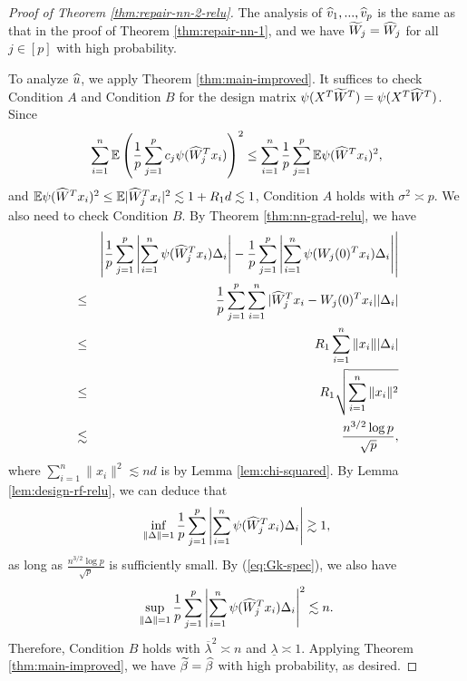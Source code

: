 \begin{proof}[Proof of Theorem \ref{thm:repair-nn-2-relu}]
The analysis of $\widehat{v}_1,...,\widehat{v}_p$ is the same as that in the proof of Theorem \ref{thm:repair-nn-1}, and we have $\widetilde{W}_j=\widehat{W}_j$ for all $j\in[p]$ with high probability.

To analyze $\widehat{u}$, we apply Theorem \ref{thm:main-improved}. It suffices to check Condition $A$ and Condition $B$ for the design matrix $\psi(X^T\widetilde{W}^T)=\psi(X^T\widehat{W}^T)$. Since
$$\sum_{i=1}^n\mathbb{E}\left(\frac{1}{p}\sum_{j=1}^pc_j\psi(\widehat{W}_j^Tx_i)\right)^2\leq \sum_{i=1}^n\frac{1}{p}\sum_{j=1}^p\mathbb{E}\psi(\widehat{W}^Tx_i)^2,$$
and $\mathbb{E}\psi(\widehat{W}^Tx_i)^2\leq \mathbb{E}|\widehat{W}_j^Tx_i|^2\lesssim 1 + R_1d\lesssim 1$, Condition $A$ holds with $\sigma^2\asymp p$.
We also need to check Condition $B$. By Theorem \ref{thm:nn-grad-relu}, we have
\begin{eqnarray*}
&& \left|\frac{1}{p}\sum_{j=1}^p\left|\sum_{i=1}^n\psi(\wh{W}_j^Tx_i)\Delta_i\right| - \frac{1}{p}\sum_{j=1}^p\left|\sum_{i=1}^n\psi(W_j(0)^Tx_i)\Delta_i\right|\right| \\
&\leq& \frac{1}{p}\sum_{j=1}^p\sum_{i=1}^n|\wh{W}_j^Tx_i-W_j(0)^Tx_i||\Delta_i| \\
&\leq& R_1\sum_{i=1}^n\|x_i\||\Delta_i| \\
&\leq& R_1\sqrt{\sum_{i=1}^n\|x_i\|^2} \\
&\lesssim& \frac{n^{3/2}\log p}{\sqrt{p}},
\end{eqnarray*}
where $\sum_{i=1}^n\|x_i\|^2\lesssim nd$ is by Lemma \ref{lem:chi-squared}. By Lemma \ref{lem:design-rf-relu}, we can deduce that
$$\inf_{\|\Delta\|=1}\frac{1}{p}\sum_{j=1}^p\left|\sum_{i=1}^n\psi(\widehat{W}_j^Tx_i)\Delta_i\right|\gtrsim 1,$$
as long as $\frac{n^{3/2}\log p}{\sqrt{p}}$ is sufficiently small. By (\ref{eq:Gk-spec}), we also have
$$\sup_{\|\Delta\|=1}\frac{1}{p}\sum_{j=1}^p\left|\sum_{i=1}^n\psi(\widehat{W}_j^Tx_i)\Delta_i\right|^2\lesssim n.$$
Therefore, Condition $B$ holds with $\overline{\lambda}^2\asymp n$ and $\underline{\lambda}\asymp 1$. Applying Theorem \ref{thm:main-improved}, we have $\widetilde{\beta}=\widehat{\beta}$ with high probability, as desired.
\end{proof}
